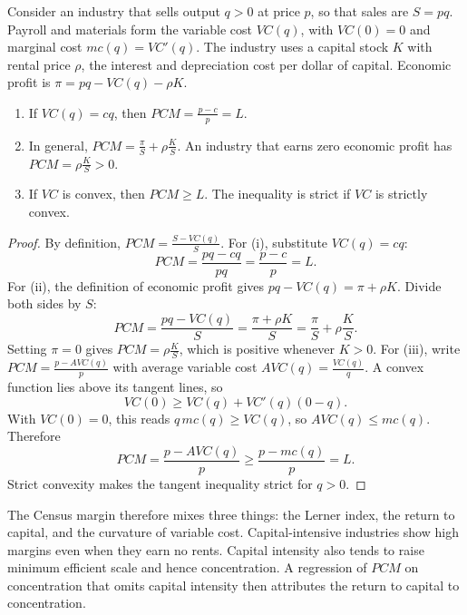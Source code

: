 \begin{proposition}\label{prop:01-pcm-bias}
Consider an industry that sells output $q > 0$ at price $p$, so that sales are $S = pq$. Payroll and
materials form the variable cost $VC(q)$, with $VC(0) = 0$ and marginal cost $mc(q) = VC'(q)$. The
industry uses a capital stock $K$ with rental price $\rho$, the interest and depreciation cost per dollar
of capital. Economic profit is $\pi = pq - VC(q) - \rho K$.
\begin{enumerate}[label=(\roman*)]
\item If $VC(q) = cq$, then $\mathit{PCM} = \frac{p - c}{p} = L$.
\item In general, $\mathit{PCM} = \frac{\pi}{S} + \rho \frac{K}{S}$. An industry that earns zero economic
profit has $\mathit{PCM} = \rho \frac{K}{S} > 0$.
\item If $VC$ is convex, then $\mathit{PCM} \ge L$. The inequality is strict if $VC$ is strictly convex.
\end{enumerate}
\end{proposition}

\begin{proof}
By definition, $\mathit{PCM} = \frac{S - VC(q)}{S}$. For (i), substitute $VC(q) = cq$:
\[
\mathit{PCM} = \frac{pq - cq}{pq} = \frac{p - c}{p} = L.
\]
For (ii), the definition of economic profit gives $pq - VC(q) = \pi + \rho K$. Divide both sides by $S$:
\[
\mathit{PCM} = \frac{pq - VC(q)}{S} = \frac{\pi + \rho K}{S} = \frac{\pi}{S} + \rho \frac{K}{S}.
\]
Setting $\pi = 0$ gives $\mathit{PCM} = \rho \frac{K}{S}$, which is positive whenever $K > 0$. For (iii),
write $\mathit{PCM} = \frac{p - AVC(q)}{p}$ with average variable cost $AVC(q) = \frac{VC(q)}{q}$. A convex
function lies above its tangent lines, so
\[
VC(0) \ge VC(q) + VC'(q)(0 - q).
\]
With $VC(0) = 0$, this reads $q \, mc(q) \ge VC(q)$, so $AVC(q) \le mc(q)$. Therefore
\[
\mathit{PCM} = \frac{p - AVC(q)}{p} \ge \frac{p - mc(q)}{p} = L.
\]
Strict convexity makes the tangent inequality strict for $q > 0$.
\end{proof}

The Census margin therefore mixes three things: the Lerner index, the return to capital, and the
curvature of variable cost. Capital-intensive industries show high margins even when they earn no rents.
Capital intensity also tends to raise minimum efficient scale and hence concentration. A regression of
$\mathit{PCM}$ on concentration that omits capital intensity then attributes the return to capital to
concentration.

